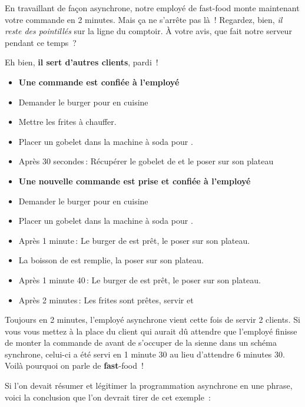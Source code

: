 \documentclass[small]{zmdocument}
\begin{document}
En travaillant de façon asynchrone, notre employé de fast-food monte maintenant votre commande en 2 minutes. Mais ça ne s’arrête pas là ! Regardez, bien, \textit{il reste des pointillés} sur la ligne du comptoir. À votre avis, que fait notre serveur pendant ce temps ?



Eh bien, \textbf{il sert d’autres clients}, pardi !



\begin{itemize}
\item\relax \textbf{Une commande  est confiée à l’employé}
\item\relax Demander le burger pour  en cuisine
\item\relax Mettre les frites à chauffer.
\item\relax Placer un gobelet dans la machine à soda pour .
\item\relax Après 30 secondes : Récupérer le gobelet de  et le poser sur son plateau
\item\relax \textbf{Une nouvelle commande  est prise et confiée à l’employé}
\item\relax Demander le burger pour  en cuisine
\item\relax Placer un gobelet dans la machine à soda pour .
\item\relax Après 1 minute : Le burger de  est prêt, le poser sur son plateau.
\item\relax La boisson de  est remplie, la poser sur son plateau.
\item\relax Après 1 minute 40 : Le burger de  est prêt, le poser sur son plateau.
\item\relax Après 2 minutes : Les frites sont prêtes, servir  et 
\end{itemize}


Toujours en 2 minutes, l’employé asynchrone vient cette fois de servir 2
clients. Si vous vous mettez à la place du client  qui aurait dû attendre
que l’employé finisse de monter la commande de  avant de s’occuper de la
sienne dans un schéma synchrone, celui-ci a été servi en 1 minute 30 au lieu
d’attendre 6 minutes 30. Voilà pourquoi on parle de \textbf{fast}-food !



Si l’on devait résumer et légitimer la programmation asynchrone en une phrase,
voici la conclusion que l’on devrait tirer de cet exemple :
\end{document}

